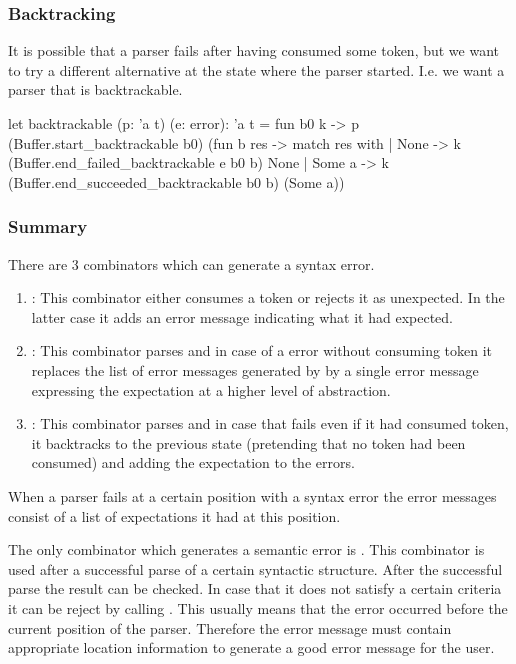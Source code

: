 \subsubsection{Backtracking}


It is possible that a parser fails after having consumed some token, but we
want to try a different alternative at the state where the parser
started. I.e. we want a parser that is backtrackable.

\begin{ocaml}
  let backtrackable (p: 'a t) (e: error): 'a t =
    fun b0 k ->
    p (Buffer.start_backtrackable b0)
      (fun b res ->
         match res with
         | None ->
             k (Buffer.end_failed_backtrackable e b0 b) None
         | Some a ->
             k (Buffer.end_succeeded_backtrackable b0 b) (Some a))
\end{ocaml}


\subsubsection{Summary}

There are 3 combinators which can generate a syntax error.
\begin{enumerate}

\item {}: This combinator either consumes a token or rejects it as
  unexpected. In the latter case it adds an error message indicating what it
  had expected.

\item {}: This combinator parses  and in case of a error
  without consuming token it replaces the list of error messages generated by
   by a single error message expressing the expectation at a higher
  level of abstraction.

\item {}: This combinator parses  and in case
  that  fails even if it had consumed token, it backtracks to the
  previous state (pretending that no token had been consumed) and adding the
  expectation  to the errors.
\end{enumerate}

When a parser fails at a certain position with a syntax error the error
messages consist of a list of expectations it had at this position.

The only combinator which generates a semantic error is . This
combinator is used after a successful parse of a certain syntactic
structure. After the successful parse the result can be checked. In case that
it does not satisfy a certain criteria it can be reject by calling . This usually means that the error occurred before the current position
of the parser. Therefore the error message must contain appropriate location
information to generate a good error message for the user.




